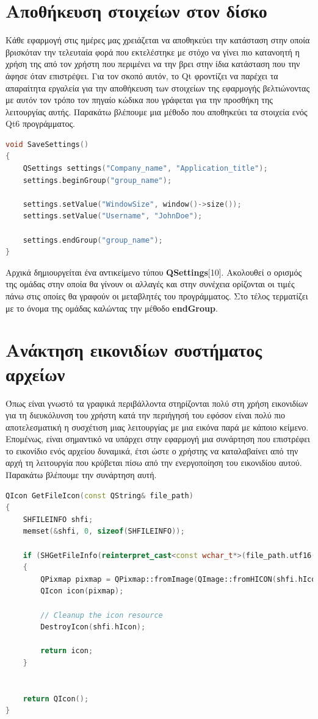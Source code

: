 \section{Αποθήκευση στοιχείων στον δίσκο}
Κάθε εφαρμογή στις ημέρες μας χρειάζεται να αποθηκεύει την κατάσταση στην οποία
βρισκόταν την τελευταία φορά που εκτελέστηκε με στόχο να γίνει πιο κατανοητή η
χρήση της από τον χρήστη που περιμένει να την βρει στην ίδια κατάσταση που την
άφησε όταν επιστρέψει. Για τον σκοπό αυτόν, το Qt φροντίζει να παρέχει τα απαραίτητα εργαλεία
για την αποθήκευση των στοιχείων της εφαρμογής βελτιώνοντας με αυτόν τον τρόπο
τον πηγαίο κώδικα που γράφεται για την προσθήκη της λειτουργίας αυτής. Παρακάτω
βλέπουμε μια μέθοδο που αποθηκεύει τα στοιχεία ενός Qt6 προγράμματος.


\begin{lstlisting}[language=C++, style=cppstyle]
void SaveSettings()
{
    QSettings settings("Company_name", "Application_title");
    settings.beginGroup("group_name");

    settings.setValue("WindowSize", window()->size());
    settings.setValue("Username", "JohnDoe");

    settings.endGroup("group_name");
}

\end{lstlisting}
Αρχικά δημιουργείται ένα αντικείμενο τύπου \textbf{QSettings}[10]. Ακολουθεί ο ορισμός
της ομάδας στην οποία θα γίνουν οι αλλαγές και στην συνέχεια ορίζονται
οι τιμές πάνω στις οποίες θα γραφούν οι μεταβλητές του προγράμματος. Στο τέλος
τερματίζει με το όνομα της ομάδας καλώντας την μέθοδο \textbf{endGroup}.

\section{Ανάκτηση εικονιδίων συστήματος αρχείων}
Όπως είναι γνωστό τα γραφικά περιβάλλοντα στηρίζονται πολύ στη χρήση εικονιδίων
για τη διευκόλυνση του χρήστη κατά την περιήγησή του εφόσον είναι πολύ πιο
αποτελεσματική η συσχέτιση μιας λειτουργίας με μια εικόνα παρά με κάποιο κείμενο.
Επομένως, είναι σημαντικό να υπάρχει στην εφαρμογή μια συνάρτηση που επιστρέφει το εικονίδιο
ενός αρχείου δυναμικά, έτσι ώστε ο χρήστης να καταλαβαίνει από την αρχή τη λειτουργία που
κρύβεται πίσω από την ενεργοποίηση του εικονιδίου αυτού. Παρακάτω βλέπουμε την συνάρτηση αυτή.


\begin{lstlisting}[language=C++, style=cppstyle]
QIcon GetFileIcon(const QString& file_path)
{
    SHFILEINFO shfi;
    memset(&shfi, 0, sizeof(SHFILEINFO));

    if (SHGetFileInfo(reinterpret_cast<const wchar_t*>(file_path.utf16()), 0, &shfi, sizeof(SHFILEINFO), SHGFI_ICON | SHGFI_USEFILEATTRIBUTES))
    {
        QPixmap pixmap = QPixmap::fromImage(QImage::fromHICON(shfi.hIcon)).scaled(QSize(PercentToWidth(6.66), PercentToHeight(11.85)), Qt::KeepAspectRatio, Qt::SmoothTransformation);
        QIcon icon(pixmap);

        // Cleanup the icon resource
        DestroyIcon(shfi.hIcon);

        return icon;
    }

    
    return QIcon();
}
\end{lstlisting}

